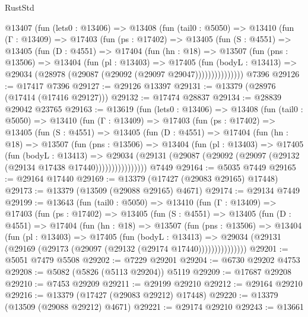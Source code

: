 \begin{lexlean}{RustStd}
\begin{coremodule}
    @13407
      (fun (lets0 : @13406) =>
      @13408
        (fun (tail0 : @5050) =>
        @13410
          (fun (Γ : @13409) =>
          @17403
            (fun (ps : @17402) =>
            @13405
              (fun (S : @4551) =>
              @13405
                (fun (D : @4551) =>
                @17404
                  (fun (hn : @18) =>
                  @13507
                    (fun (pns : @13506) =>
                    @13404
                      (fun (pl : @13403) =>
                      @17405
                        (fun (bodyL : @13413) =>
                        @29034 (@28978 (@29087 (@29092 (@29097 @29047)))))))))))))))
    @7396
@29126 := @17417 @7396
@29127 := @29126 @13397
@29131 := @13379 (@28976 (@17414 (@17416 @29127)))
@29132 := @17474 @28837
@29134 := @28839 @29042 @23765
@29163 := @13619
    (fun (lets0 : @13406) =>
    @13408
      (fun (tail0 : @5050) =>
      @13410
        (fun (Γ : @13409) =>
        @17403
          (fun (ps : @17402) =>
          @13405
            (fun (S : @4551) =>
            @13405
              (fun (D : @4551) =>
              @17404
                (fun (hn : @18) =>
                @13507
                  (fun (pns : @13506) =>
                  @13404
                    (fun (pl : @13403) =>
                    @17405
                      (fun (bodyL : @13413) =>
                      @29034
                        (@29131
                          (@29087 (@29092 (@29097 (@29132 (@29134 @17438 @17440))))))))))))))))
    @7449
@29164 := @5035 @7449
@29165 := @29164 @17440
@29169 := @13379 (@17427 (@29083 @29165) @17448)
@29173 := @13379 (@13509 (@29088 @29165) @4671)
@29174 := @29134 @7449
@29199 := @13643
    (fun (tail0 : @5050) =>
    @13410
      (fun (Γ : @13409) =>
      @17403
        (fun (ps : @17402) =>
        @13405
          (fun (S : @4551) =>
          @13405
            (fun (D : @4551) =>
            @17404
              (fun (hn : @18) =>
              @13507
                (fun (pns : @13506) =>
                @13404
                  (fun (pl : @13403) =>
                  @17405
                    (fun (bodyL : @13413) =>
                    @29034 (@29131 (@29169 (@29173 (@29097 (@29132 (@29174 @17440)))))))))))))))
@29201 := @5051 @7479 @5508
@29202 := @7229 @29201
@29204 := @6730 @29202 @4753
@29208 := @5082 (@5826 (@5113 @29204)) @5119
@29209 := @17687 @29208
@29210 := @7453 @29209
@29211 := @29199 @29210
@29212 := @29164 @29210
@29216 := @13379 (@17427 (@29083 @29212) @17448)
@29220 := @13379 (@13509 (@29088 @29212) @4671)
@29221 := @29174 @29210
@29243 := @13661

\end{coremodule}
\end{lexlean}
